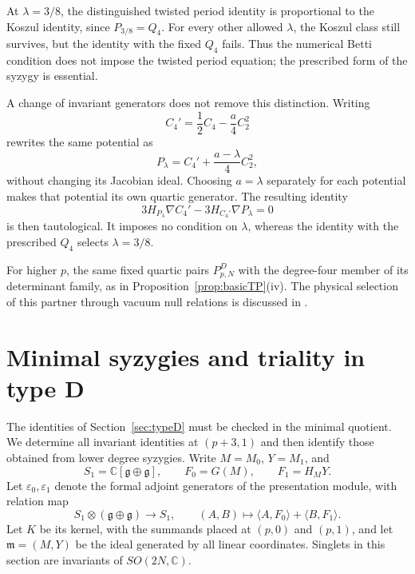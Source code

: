 \documentclass[10pt,reqno]{amsart}
\numberwithin{equation}{section}
\theoremstyle{plain}
\theoremstyle{definition}
\newcommand{\ip}[2]{\langle #1, #2\rangle}
\begin{document}
At $\lambda=3/8$, the distinguished twisted period identity is proportional to the Koszul identity, since $P_{3/8}=Q_4$. For every other allowed $\lambda$, the Koszul class still survives, but the identity with the fixed $Q_4$ fails. Thus the numerical Betti condition does not impose the twisted period equation; the prescribed form of the syzygy is essential.

A change of invariant generators does not remove this distinction. Writing
\begin{equation*}
	C_4'=\frac12C_4-\frac a4C_2^2
\end{equation*}
rewrites the same potential as
\begin{equation*}
	P_\lambda=C_4'+\frac{a-\lambda}4C_2^2,
\end{equation*}
without changing its Jacobian ideal. Choosing $a=\lambda$ separately for each potential makes that potential its own quartic generator. The resulting identity
\begin{equation*}
	3H_{P_\lambda}\nabla C_4'-3H_{C_4'}\nabla P_\lambda=0
\end{equation*}
is then tautological. It imposes no condition on $\lambda$, whereas the identity with the prescribed $Q_4$ selects $\lambda=3/8$.

For higher $p$, the same fixed quartic pairs $P^D_{p,N}$ with the degree-four member of its determinant family, as in Proposition~\ref{prop:basicTP}(iv). The physical selection of this partner through vacuum null relations is discussed in \cite{Kang:2026ney}.


\section{Minimal syzygies and triality in type D}\label{sec:minimal}


The identities of Section~\ref{sec:typeD} must be checked in the minimal quotient. We determine all invariant identities at $(p+3,1)$ and then identify those obtained from lower degree syzygies. Write $M=M_0$, $Y=M_1$, and
\begin{equation*}
	S_1=\mathbb{C}[\mathfrak{g}\oplus\mathfrak{g}],\qquad F_0=G(M),\qquad F_1=H_MY .
\end{equation*}
Let $\varepsilon_0,\varepsilon_1$ denote the formal adjoint generators of the presentation module, with relation map
\begin{equation*}
	S_1\otimes(\mathfrak{g}\oplus\mathfrak{g})\longrightarrow S_1,\qquad (A,B)\longmapsto\ip A{F_0}+\ip B{F_1}.
\end{equation*}
Let $K$ be its kernel, with the summands placed at $(p,0)$ and $(p,1)$, and let $\mathfrak{m}=(M,Y)$ be the ideal generated by all linear coordinates. Singlets in this section are invariants of $SO(2N,\mathbb{C})$.
\end{document}
